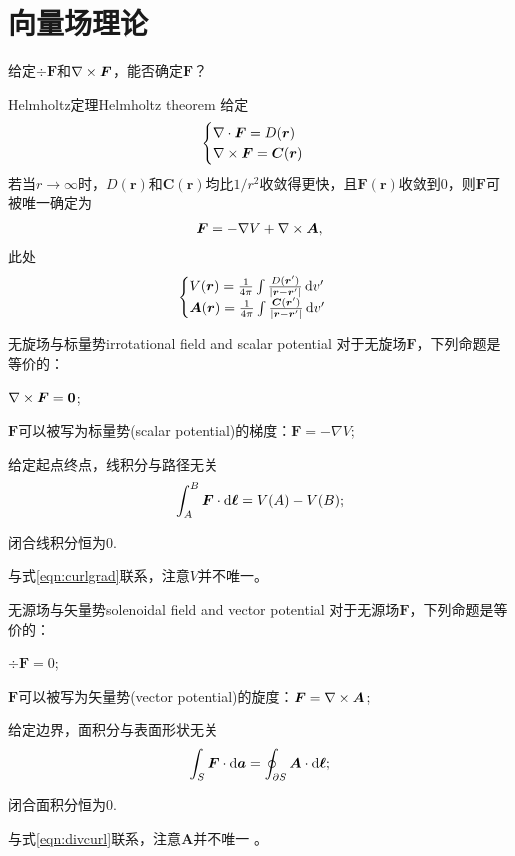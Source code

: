 \section{向量场理论}
给定$\div\bm F$和$\nabla\times\bm F$，能否确定$\bm F$？
\begin{theorem}{Helmholtz定理}{Helmholtz theorem}
    给定
    \[
        \begin{cases}
            \nabla\cdot\bm F=D(\bm r)\\
            \nabla\times\bm F=\bm C(\bm r)
        \end{cases}
    \]
    若当$r\to\infty$时，$D(\bm r)$和$\bm C(\bm r)$均比$1/r^2$收敛得更快，且$\bm F(\bm r)$收敛到0，则$\bm F$可被唯一确定为
    \begin{align}
        \bm F=-\nabla V+\nabla\times\bm A,
    \end{align}
    此处
    \begin{align}
        \begin{cases}
            V(\bm r)=\frac1{4\pi}\int\frac{D(\bm r')}{|\bm r-\bm r'|}\mathop{}\!\mathrm{d} v'\\
            \bm A(\bm r)=\frac1{4\pi}\int\frac{\bm C(\bm r')}{|\bm r-\bm r'|}\mathop{}\!\mathrm{d} v'
        \end{cases}
    \end{align}
\end{theorem}
\begin{theorem}{无旋场与标量势}{irrotational field and scalar potential}
    对于无旋场$\bm F$，下列命题是等价的：
    \begin{compactitem}
        \item $\nabla\times\bm F=\bm 0$;
        \item $\bm F$可以被写为标量势(scalar potential)的梯度：$\bm F=-\nabla V$;
        \item 给定起点终点，线积分与路径无关\[
            \int_A^B\bm F\cdot\mathop{}\!\mathrm{d}\bm\ell=V(A)-V(B);
        \]
        \item 闭合线积分恒为0.
    \end{compactitem}
\end{theorem}
与式\eqref{eqn:curlgrad}联系，注意$V$并不唯一。
\begin{theorem}{无源场与矢量势}{solenoidal field and vector potential}
    对于无源场$\bm F$，下列命题是等价的：
    \begin{compactitem}
        \item $\div\bm F=0$;
        \item $\bm F$可以被写为矢量势(vector potential)的旋度：$\bm F=\nabla\times\bm A$;
        \item 给定边界，面积分与表面形状无关
        \[
            \int_S\bm F\cdot\mathop{}\!\mathrm{d}\bm a=\oint_{\partial S}\bm A\cdot\mathop{}\!\mathrm{d}\bm\ell;
        \]
        \item 闭合面积分恒为0.
    \end{compactitem}
\end{theorem}
与式\eqref{eqn:divcurl}联系，注意$\bm A$并不唯一 。

